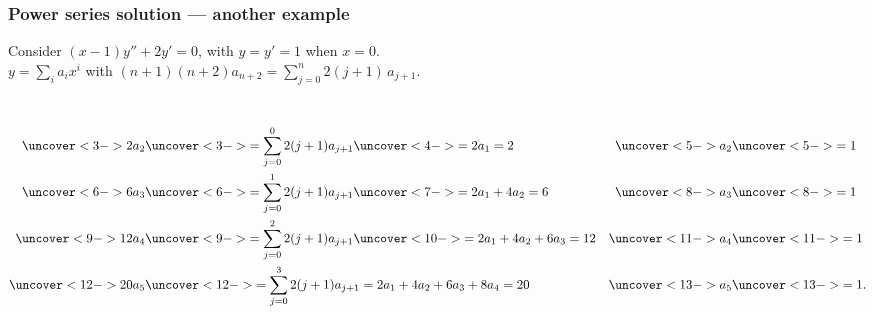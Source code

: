 \documentclass[9pt]{beamer}
\begin{document}
\begin{frame}[t]
 \frametitle{Power series solution --- another example}
 
 Consider $(x-1)y''+2y'=0$, with $y=y'=1$ when $x=0$. \\
 $y=\sum_ia_ix^i$ with $(n+1)(n+2)a_{n+2} = \sum_{j=0}^n 2(j+1)\,a_{j+1}$.

 \reminderbar

 \\

 \begin{align*}
  \uc< 3->{ 2a_2} &\uc< 3->{= \sum_{j=0}^0 2(j+1)a_{j+1}}\uc< 4->{ = 2a_1 = 2} & \uc<5->{a_2} & \uc<5->{=1} \\ 
  \uc< 6->{ 6a_3} &\uc< 6->{= \sum_{j=0}^1 2(j+1)a_{j+1}}\uc< 7->{ = 2a_1+4a_2 = 6} & \uc<8->{a_3} &\uc<8->{= 1}\\
  \uc< 9->{12a_4} &\uc< 9->{= \sum_{j=0}^2 2(j+1)a_{j+1}}\uc<10->{ = 2a_1+4a_2+6a_3 = 12} & \uc<11->{a_4} &\uc<11->{= 1}\\
  \uc<12->{20a_5} &\uc<12->{= \sum_{j=0}^3 2(j+1)a_{j+1} = 2a_1+4a_2+6a_3+8a_4 = 20} & \uc<13->{a_5} &\uc<13->{= 1.}
 \end{align*}

\end{frame}
\end{document}
